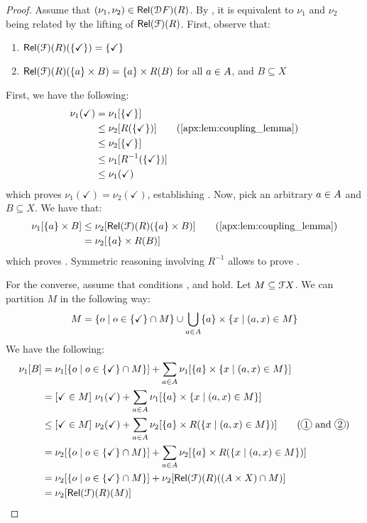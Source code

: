 \begin{proof}
Assume that $(\nu_1, \nu_2) \in {\mathsf{Rel}}(\mathcal{D} F)(R)$. By , it is equivalent to $\nu_1$ and $\nu_2$ being related by the lifting of ${\mathsf{Rel}}(\mathcal{F})(R)$. First, observe that:
\begin{enumerate}
	\item  ${\mathsf{Rel}}(\mathcal{F})(R)(\{\checkmark\})= \{\checkmark\}$
	\item  ${\mathsf{Rel}}(\mathcal{F})(R)(\{a\} \times B) = \{a\} \times R(B)$ for all $a \in {A}$, and $B \subseteq X$
\end{enumerate}
First, we have the following:
\begin{align*}
\nu_1(\checkmark) &= \nu_1[\{\checkmark\}] \\
&\leq \nu_2[R(\{\checkmark\})] \tag{\Cref{apx:lem:coupling_lemma}} \\
&\leq \nu_2[\{\checkmark\}] \\
&\leq \nu_1[R^{-1}(\{\checkmark\})] \\
&\leq \nu_1(\checkmark)
\end{align*}
which proves $\nu_1(\checkmark) = \nu_2(\checkmark)$, establishing . Now, pick an arbitrary $a \in {A}$ and $B \subseteq X$. We have that:
\begin{align*}
\nu_1[\{a\} \times B] &\leq \nu_2[\Rel(\funF)(R)(\{a\} \times B)] \tag{\Cref{apx:lem:coupling_lemma}}\\
&=\nu_2[\{a\} \times R(B)]
\end{align*}
which proves . Symmetric reasoning involving $R^{-1}$ allows to prove .

For the converse, assume that conditions ,  and  hold. Let $M \subseteq \mathcal{F} X$. We can partition $M$ in the following way:
$$M = \{o \mid o \in \{\checkmark\} \cap M\} \cup \bigcup_{a \in {A}} \{a\} \times \{x \mid (a,x) \in M\}$$
We have the following:
\begin{align*}
\nu_1[B] &= \nu_1[\{o \mid o \in \{\checkmark\} \cap M\} ] + \sum_{a \in \alphabet} \nu_1[\{a\} \times \{x \mid (a,x) \in M\}] \\
&= [\checkmark \in M]~\nu_1(\checkmark) + \sum_{a \in \alphabet} \nu_1[\{a\} \times \{x \mid (a,x) \in M\}] \\
&\leq [\checkmark \in M]~\nu_2(\checkmark) + \sum_{a \in \alphabet} \nu_2[\{a\} \times R(\{x \mid (a,x) \in M\})] \tag{\circlednum{1} and \circlednum{2}}\\
&=\nu_2[\{o \mid o \in \{\checkmark\} \cap M\} ] + \sum_{a \in \alphabet} \nu_2[\{a\} \times R(\{x \mid (a,x) \in M\})] \\
&=\nu_2[\{o \mid o \in \{\checkmark\} \cap M\} ] + \nu_2[\Rel(\funF)(R)((A \times X)\cap M)] \\
&=\nu_2[\Rel(\funF)(R)(M)]
\end{align*}


\end{proof}
